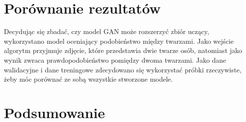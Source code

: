 \documentclass[eng,printmode]{mgr}
\begin{document}







\chapter{Porównanie rezultatów}

Decydując się zbadać, czy model GAN może rozszerzyć zbiór uczący, wykorzystano model oceniający podobieństwo między twarzami. Jako wejście algorytm przyjmuje zdjęcie, które przedstawia dwie twarze osób, natomiast jako wynik zwraca prawdopodobieństwo pomiędzy dwoma twarzami. Jako dane walidacyjne i dane treningowe zdecydowano się wykorzystać próbki rzeczywiste, żeby móc porównać ze sobą wszystkie stworzone modele.









%
%












\chapter{Podsumowanie}


\end{document}
